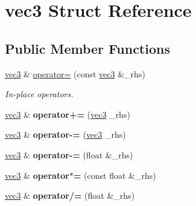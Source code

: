 \hypertarget{structvec3}{\section{vec3 Struct Reference}
\label{structvec3}
}
\subsection*{Public Member Functions}
\begin{DoxyCompactItemize}
\item 
\hypertarget{structvec3_aafb7ecdfa8e4b970c1cc1c7d57fa21d8}{\hyperlink{structvec3}{vec3} \& \hyperlink{structvec3_aafb7ecdfa8e4b970c1cc1c7d57fa21d8}{operator=} (const \hyperlink{structvec3}{vec3} \&\-\_\-rhs)}\label{structvec3_aafb7ecdfa8e4b970c1cc1c7d57fa21d8}

\begin{DoxyCompactList}\small\item\em In-\/place operators. \end{DoxyCompactList}\item 
\hypertarget{structvec3_a7b93a790c3d2a7c0aea53a71b33d3d91}{\hyperlink{structvec3}{vec3} \& {\bfseries operator+=} (\hyperlink{structvec3}{vec3} \-\_\-rhs)}\label{structvec3_a7b93a790c3d2a7c0aea53a71b33d3d91}

\item 
\hypertarget{structvec3_af4b8cb034f4d5f6a6fe1114212edb045}{\hyperlink{structvec3}{vec3} \& {\bfseries operator-\/=} (\hyperlink{structvec3}{vec3} \-\_\-rhs)}\label{structvec3_af4b8cb034f4d5f6a6fe1114212edb045}

\item 
\hypertarget{structvec3_a7166fb84027a0495c113e6ff84a7b099}{\hyperlink{structvec3}{vec3} \& {\bfseries operator-\/=} (float \&\-\_\-rhs)}\label{structvec3_a7166fb84027a0495c113e6ff84a7b099}

\item 
\hypertarget{structvec3_ad8e0f160a52469574ce2fa12306fd306}{\hyperlink{structvec3}{vec3} \& {\bfseries operator$\ast$=} (const float \&\-\_\-rhs)}\label{structvec3_ad8e0f160a52469574ce2fa12306fd306}

\item 
\hypertarget{structvec3_a2ff9112416eb3a467dd1592469e6272f}{\hyperlink{structvec3}{vec3} \& {\bfseries operator/=} (float \&\-\_\-rhs)}\label{structvec3_a2ff9112416eb3a467dd1592469e6272f}

\end{DoxyCompactItemize}
